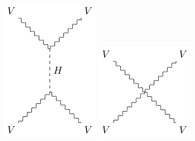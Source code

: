 \begin{figure}[!ht]
\begin{minipage}{0.23\textwidth}
  \end{minipage}%
  \begin{minipage}{0.18\textwidth}
    \includegraphics[width=\textwidth]{figures/feyn_vbs_5.pdf}
  \end{minipage}%
  \begin{minipage}{0.16\textwidth}
    \includegraphics[width=\textwidth]{figures/feyn_vbs_1.pdf}

\end{minipage}
\end{figure}

